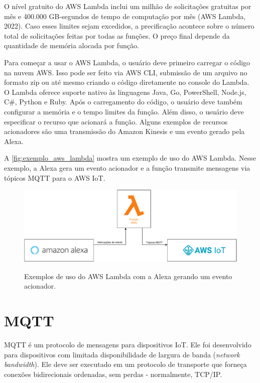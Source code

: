 O nível gratuito do AWS Lambda inclui um milhão de solicitações gratuitas por mês e 400.000 GB-segundos de tempo de computação por mês (AWS Lambda, 2022). Caso esses limites sejam excedidos, a precificação acontece sobre o número total de solicitações feitas por todas as funções. O preço final depende da quantidade de memória alocada por função.

Para começar a usar o AWS Lambda, o usuário deve primeiro carregar o código na nuvem AWS. Isso pode ser feito via AWS CLI, submissão de um arquivo no formato zip ou até mesmo criando o código diretamente no console do Lambda.  O Lambda oferece suporte nativo às linguagens Java, Go, PowerShell, Node.js, C\#, Python e Ruby. Após o carregamento do código, o usuário deve também configurar a memória e o tempo limites da função. Além disso, o usuário deve especificar o recurso que acionará a função. Alguns exemplos de recursos acionadores são uma transmissão do Amazon Kinesis e um evento gerado pela Alexa.

A \autoref{fig:exemplo_aws_lambda} mostra um exemplo de uso do AWS Lambda. Nesse exemplo, a Alexa gera um evento acionador e a função transmite mensagens via tópicos MQTT para o AWS IoT.

\begin{figure}[htbp]
	\centering
	\caption{Exemplos de uso do AWS Lambda com a Alexa gerando um evento acionador.}
	\includegraphics[scale=0.6]{Imagens/exemplo_aws_lambda.pdf}
	\label{fig:exemplo_aws_lambda}
\end{figure}

\section{MQTT}\label{section:mqtt}

MQTT é um protocolo de mensagens para dispositivos IoT. Ele foi desenvolvido para dispositivos com limitada disponibilidade de largura de banda (\textit{network bandwidth}). Ele deve ser executado em um protocolo de transporte que forneça conexões bidirecionais ordenadas, sem perdas - normalmente, TCP/IP.

